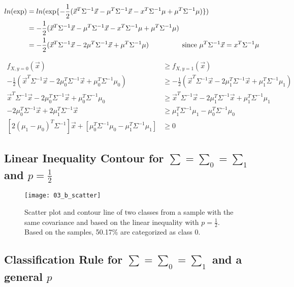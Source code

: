 \documentclass[12pt, a4paper, titlepage, fleqn]{article}
\begin{document}
\begin{align}
	ln(\text{exp}) &= ln(\text{exp}\{-\frac{1}{2}(\vec{x}^T\Sigma^{-1}\vec{x}-\mu^T\Sigma^{-1}\vec{x}-x^T\Sigma^{-1}\mu+\mu^T\Sigma^{-1}\mu)\})
	\\
	&= -\frac{1}{2}(\vec{x}^T\Sigma^{-1}\vec{x}-\mu^T\Sigma^{-1}\vec{x}-x^T\Sigma^{-1}\mu+\mu^T\Sigma^{-1}\mu)
	\\
	&= -\frac{1}{2}(\vec{x}^T\Sigma^{-1}\vec{x}-2\mu^T\Sigma^{-1}\vec{x}+\mu^T\Sigma^{-1}\mu) & \hspace{-48pt} \text{since $\mu^T\Sigma^{-1}\vec{x}=x^T\Sigma^{-1}\mu$}
\end{align}

\begin{align}
	f_{X,y=0}(\vec{x}) &\geq f_{X,y=1}(\vec{x})
	\\
	-\frac{1}{2}(\vec{x}^T\Sigma^{-1}\vec{x}-2\mu_0^T\Sigma^{-1}\vec{x}+\mu_0^T\Sigma^{-1}\mu_0)
	& \geq
	-\frac{1}{2}(\vec{x}^T\Sigma^{-1}\vec{x}-2\mu_1^T\Sigma^{-1}\vec{x}+\mu_1^T\Sigma^{-1}\mu_1)
	\\
	\vec{x}^T\Sigma^{-1}\vec{x}-2\mu_0^T\Sigma^{-1}\vec{x}+\mu_0^T\Sigma^{-1}\mu_0
	& \geq
	\vec{x}^T\Sigma^{-1}\vec{x}-2\mu_1^T\Sigma^{-1}\vec{x}+\mu_1^T\Sigma^{-1}\mu_1
	\\
	-2\mu_0^T\Sigma^{-1}\vec{x}+2\mu_1^T\Sigma^{-1}\vec{x} 
	& \geq
	\mu_1^T\Sigma^{-1}\mu_1-\mu_0^T\Sigma^{-1}\mu_0
	\\
	[2(\mu_1-\mu_0)^T\Sigma^{-1}]\vec{x}+[\mu_0^T\Sigma^{-1}\mu_0-\mu_1^T\Sigma^{-1}\mu_1] &\geq 0
\end{align}

\subsection{Linear Inequality Contour for $\sum = \sum_0 = \sum_1$ and  $p=\frac{1}{2}$}

\begin{figure}[h!]
	\centering
	\vspace{-16pt}
	\texttt{[image: 03\_b\_scatter]}
	\caption{Scatter plot and contour line of two classes from a sample with the same covariance and based on the linear inequality with $p=\frac{1}{2}$. Based on the samples, 50.17\% are categorized as class 0.} 
	\label{fig:contour for p=0.5}
\end{figure}

\subsection{Classification Rule for $\sum = \sum_0 = \sum_1$ and a general $p$}
\end{document}
